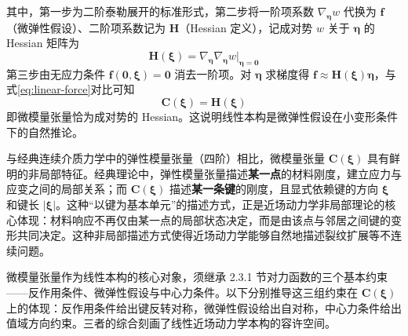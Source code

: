 其中，第一步为二阶泰勒展开的标准形式，第二步将一阶项系数 $\nabla_{\boldsymbol{\eta}}w$ 代换为 $\mathbf{f}$（微弹性假设）、二阶项系数记为 $\mathbf{H}$（Hessian 定义），记成对势 $w$ 关于 $\boldsymbol{\eta}$ 的 Hessian 矩阵为
\begin{equation}
  \mathbf{H}(\boldsymbol{\xi})=\nabla_{\boldsymbol{\eta}}\nabla_{\boldsymbol{\eta}}w\big|_{\boldsymbol{\eta}=\mathbf{0}}
  \label{eq:pairwise-hessian}
\end{equation}第三步由无应力条件 $\mathbf{f}(\mathbf{0},\boldsymbol{\xi})=\mathbf{0}$ 消去一阶项。对 $\boldsymbol{\eta}$ 求梯度得 $\mathbf{f}\approx\mathbf{H}(\boldsymbol{\xi})\boldsymbol{\eta}$，与式\eqref{eq:linear-force}对比可知
\begin{equation}
  \mathbf{C}(\boldsymbol{\xi})=\mathbf{H}(\boldsymbol{\xi})
  \label{eq:micro-modulus-hessian}
\end{equation}
即微模量张量恰为成对势的 Hessian。这说明线性本构是微弹性假设在小变形条件下的自然推论。

与经典连续介质力学中的弹性模量张量（四阶）相比，微模量张量 $\mathbf{C}(\boldsymbol{\xi})$ 具有鲜明的非局部特征。经典理论中，弹性模量张量描述\textbf{某一点}的材料刚度，建立应力与应变之间的局部关系；而 $\mathbf{C}(\boldsymbol{\xi})$ 描述\textbf{某一条键}的刚度，且显式依赖键的方向 $\boldsymbol{\xi}$ 和键长 $|\boldsymbol{\xi}|$。这种``以键为基本单元''的描述方式，正是近场动力学非局部理论的核心体现：材料响应不再仅由某一点的局部状态决定，而是由该点与邻居之间键的变形共同决定。这种非局部描述方式使得近场动力学能够自然地描述裂纹扩展等不连续问题。

微模量张量作为线性本构的核心对象，须继承 2.3.1 节对力函数的三个基本约束——反作用条件、微弹性假设与中心力条件。以下分别推导这三组约束在 $\mathbf{C}(\boldsymbol{\xi})$ 上的体现：反作用条件给出键反转对称，微弹性假设给出自对称，中心力条件给出值域方向约束。三者的综合刻画了线性近场动力学本构的容许空间。

